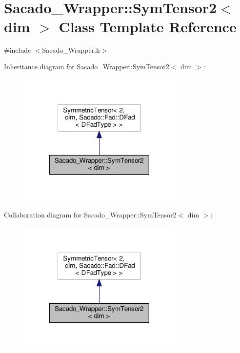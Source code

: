 \hypertarget{classSacado__Wrapper_1_1SymTensor2}{}\section{Sacado\+\_\+\+Wrapper\+:\+:Sym\+Tensor2$<$ dim $>$ Class Template Reference}
\label{classSacado__Wrapper_1_1SymTensor2}


{\ttfamily \#include $<$Sacado\+\_\+\+Wrapper.\+h$>$}



Inheritance diagram for Sacado\+\_\+\+Wrapper\+:\+:Sym\+Tensor2$<$ dim $>$\+:\nopagebreak
\begin{figure}[H]
\begin{center}
\leavevmode
\includegraphics[width=233pt]{classSacado__Wrapper_1_1SymTensor2__inherit__graph}
\end{center}
\end{figure}


Collaboration diagram for Sacado\+\_\+\+Wrapper\+:\+:Sym\+Tensor2$<$ dim $>$\+:\nopagebreak
\begin{figure}[H]
\begin{center}
\leavevmode
\includegraphics[width=233pt]{classSacado__Wrapper_1_1SymTensor2__coll__graph}
\end{center}
\end{figure}
